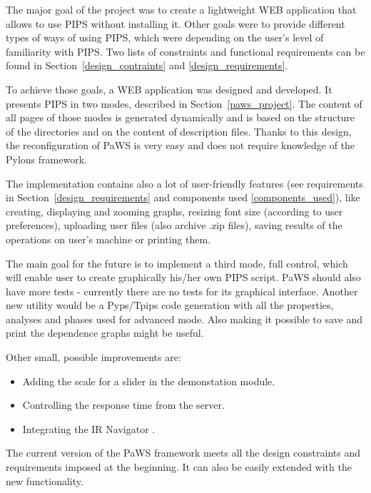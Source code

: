 
The major goal of the project was to create a lightweight WEB
application that allows to use PIPS without installing it. Other goals
were to provide different types of ways of using PIPS, which were
depending on the user's level of familiarity with PIPS. Two lists of
constraints and functional requirements can be found in
Section~\ref{design_contraints} and \ref{design_requirements}.

To achieve those goals, a WEB application was designed and
developed. It presents PIPS in two modes, described in
Section~\ref{paws_project}. The content of all pages of those modes is
generated dynamically and is based on the structure of the directories
and on the content of description files. Thanks to this design, the
reconfiguration of PaWS is very easy and does not require knowledge of
the Pylons framework.

The implementation contains also a lot of user-friendly features (see
requirements in Section~\ref{design_requirements} and components used
\ref{components_used}), like creating, displaying and zooming graphs,
resizing font size (according to user preferences), uploading user
files (also archive .zip files), saving results of the operations on
user's machine or printing them.

The main goal for the future is to implement a third mode, full
control, which will enable user to create graphically his/her own PIPS
script. PaWS should also have more tests - currently there are no
tests for its graphical interface. Another new utility would be a
Pyps/Tpips code generation with all the properties, analyses and
phases used for advanced mode. Also making it possible to save and
print the dependence graphs might be useful.

Other small, possible improvements are:
\begin{itemize}
  \item Adding the scale for a slider in the demonstation module.
  \item Controlling the response time from the server.
  \item Integrating the IR Navigator \cite{irnavigator}.
\end{itemize}

The current version of the PaWS framework meets all the design
constraints and requirements imposed at the beginning. It can also be
easily extended with the new functionality.
